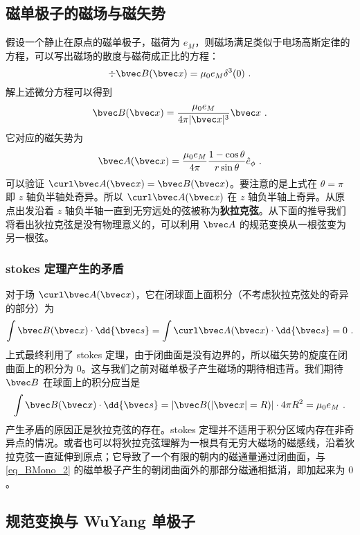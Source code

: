 \subsection{磁单极子的磁场与磁矢势}
假设一个静止在原点的磁单极子，磁荷为 $e_M$，则磁场满足类似于电场高斯定律的方程，可以写出磁场的散度与磁荷成正比的方程：
\begin{equation}\label{eq_BMono_4}
\div \bvec B(\bvec x)=\mu_0 e_M\delta^3(0)~.
\end{equation}
解上述微分方程可以得到
\begin{equation}
\bvec B(\bvec x)=\frac{\mu_0 e_M}{4\pi |\bvec x|^3}\bvec x~.
\end{equation}
它对应的磁矢势为
\begin{equation}\label{eq_BMono_5}
\bvec A(\bvec x)=\frac{\mu_0 e_M}{4\pi } \frac{1-\cos\theta}{r\sin\theta} \hat e_\phi~.
\end{equation}
可以验证 $\curl \bvec A(\bvec x) = \bvec B(\bvec x)$。要注意的是上式在 $\theta=\pi$ 即 $z$ 轴负半轴处奇异。所以 $\curl \bvec A(\bvec x)$ 在 $z$ 轴负半轴上奇异。从原点出发沿着 $z$ 轴负半轴一直到无穷远处的弦被称为\textbf{狄拉克弦}。从下面的推导我们将看出狄拉克弦是没有物理意义的，可以利用 $\bvec A$ 的规范变换从一根弦变为另一根弦。
\subsubsection{stokes 定理产生的矛盾}
对于场 $\curl \bvec A(\bvec x)$，它在闭球面上面积分（不考虑狄拉克弦处的奇异的部分）为
\begin{equation}\label{eq_BMono_3}
\int \bvec B(\bvec x)\cdot \dd{\bvec s} =\int \curl \bvec A(\bvec x) \cdot \dd{\bvec s}=0~. 
\end{equation}
上式最终利用了 stokes 定理，由于闭曲面是没有边界的，所以磁矢势的旋度在闭曲面上的积分为 $0$。这与我们之前对磁单极子产生磁场的期待相违背。我们期待 $\bvec B$ 在球面上的积分应当是
\begin{equation}\label{eq_BMono_2}
\int \bvec B(\bvec x)\cdot \dd{\bvec s}=|\bvec B(|\bvec x|=R)|\cdot 4\pi R^2=\mu_0 e_M~.
\end{equation}
产生矛盾的原因正是狄拉克弦的存在。stokes 定理并不适用于积分区域内存在非奇异点的情况。或者也可以将狄拉克弦理解为一根具有无穷大磁场的磁感线，沿着狄拉克弦一直延伸到原点；它导致了一个有限的朝内的磁通量通过闭曲面，与\autoref{eq_BMono_2} 的磁单极子产生的朝闭曲面外的那部分磁通相抵消，即加起来为 $0$。
\subsection{规范变换与 WuYang 单极子}

